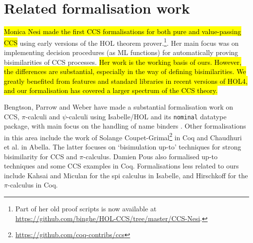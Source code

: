 \section{Related formalisation work}
\label{s:rel}

\hl{Monica Nesi made the first CCS formalisations for both pure and
value-passing CCS} \cite{Nesi:1992ve,Nesi:2017wo} using early versions of the HOL
theorem prover.\footnote{Part of her old proof scripts is now available at
  \url{https://github.com/binghe/HOL-CCS/tree/master/CCS-Nesi}.}.
Her main focus was on implementing decision procedures (as ML functions) for
automatically proving bisimilarities of CCS
processes. %
\hl{Her work is
  the working basis of ours. However, the differences are substantial, especially in the way of defining
bisimilarities. We greatly benefited from features and standard
libraries in recent versions of HOL4, and our formalisation has
covered a  larger spectrum of the  CCS theory.}

Bengtson,  Parrow and Weber
have made a substantial formalisation work 
on CCS, $\pi$-calculi
and $\psi$-calculi 
using Isabelle/HOL and its \texttt{nominal} datatype package, with main focus on the handling of
name binders \cite{bengtson2010formalising,bengtson2007completeness,bengtson2007formalising}.
%
Other formalisations in this area include the work of Solange
Coupet-Grimal\footnote{\url{https://github.com/coq-contribs/ccs}} in Coq
and Chaudhuri et al.\;\cite{chaudhuri2015lightweight} in Abella. The
latter focuses on `bisimulation up-to' techniques for strong bisimilarity 
for CCS and $\pi$-calculus.
Damien Pous also formalised up-to techniques and some CCS examples in
Coq. \cite{pous2007new}
Formalisations less related to ours
include Kahsai and Miculan \cite{kahsai2008implementing} for the spi
calculus  in Isabelle, and Hirschkoff \cite{hirschkoff1997full} for the $\pi$-calculus in Coq.
